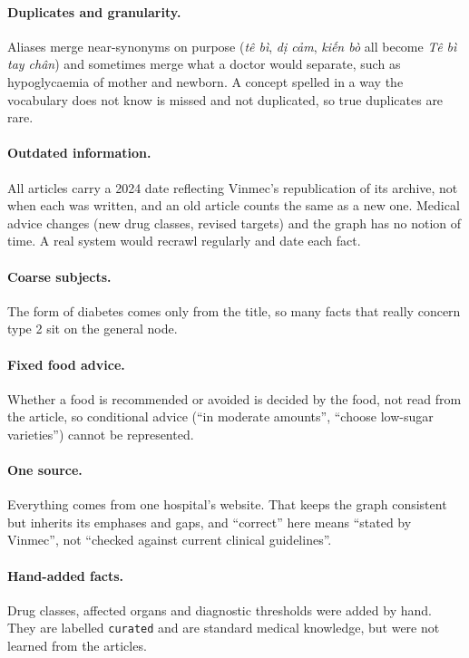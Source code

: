 \documentclass[11pt, a4paper]{article}
\newcommand{\code}[1]{\texttt{#1}}
\begin{document}
\paragraph{Duplicates and granularity.} Aliases merge near-synonyms on purpose (\emph{tê bì}, \emph{dị cảm}, \emph{kiến bò} all become \emph{Tê bì tay chân}) and sometimes merge what a doctor would separate, such as hypoglycaemia of mother and newborn. A concept spelled in a way the vocabulary does not know is missed and not duplicated, so true duplicates are rare.

\paragraph{Outdated information.} All articles carry a 2024 date reflecting Vinmec's republication of its archive, not when each was written, and an old article counts the same as a new one. Medical advice changes (new drug classes, revised targets) and the graph has no notion of time. A real system would recrawl regularly and date each fact.

\paragraph{Coarse subjects.} The form of diabetes comes only from the title, so many facts that really concern type 2 sit on the general node.

\paragraph{Fixed food advice.} Whether a food is recommended or avoided is decided by the food, not read from the article, so conditional advice (``in moderate amounts'', ``choose low-sugar varieties'') cannot be represented.

\paragraph{One source.} Everything comes from one hospital's website. That keeps the graph consistent but inherits its emphases and gaps, and ``correct'' here means ``stated by Vinmec'', not ``checked against current clinical guidelines''.

\paragraph{Hand-added facts.} Drug classes, affected organs and diagnostic thresholds were added by hand. They are labelled \code{curated} and are standard medical knowledge, but were not learned from the articles.
\end{document}
